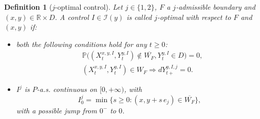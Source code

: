 \documentclass[10pt,a4paper]{amsart}
\newtheorem{definition}{Definition}
\newcommand\Pb{\mathbb{P}}
\def \R {\mathbb{R}}
\def\cI{{\mathcal I}}
\begin{document}
\begin{definition}[$j$-optimal control]\label{def:i_optimal_control}
Let $j\in\{ 1,2 \}$, $F$ a $j$-admissible boundary and $(x,y)\in \R\times {D}$. A control $I\in \cI(y)$ is called \emph{$j$-optimal with respect to $F$ and $(x,y)$} if:
\begin{itemize}
\item[(i)] both the following conditions hold for {any $t\geq 0$}: 
\begin{align}%
&{\Pb\Big( (X^{x,y,I}_t,Y^{y,I}_t) \notin \overline{W_F} , Y^{y,I}_t \in D  \Big) = 0 },%
\label{eq:cond_a_i_optimal}\\
&(X^{x,y,I}_t, Y^{y,I}_t) \in W_F \Rightarrow {d Y^{y,I,j}_{t+}} = 0.%
\label{eq:cond_b_i_optimal} %
\end{align}
\item[(ii)] $I^j$ is {$P$-a.s.} continuous {on $[0,+\infty)$}, with
\begin{equation}\label{eq:cond_c_i_optimal}
I^j_0 = \min\{ s\geq 0 : (x,y+s \, e_j)  \in \overline{W_F} \},
\end{equation}
with a possible jump from $0^-$ to $0$.
\end{itemize}
\end{definition}
\end{document}
